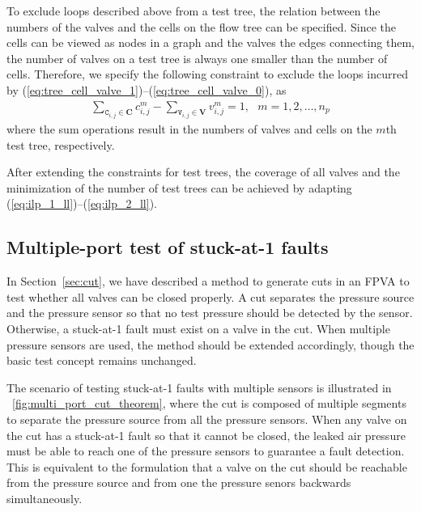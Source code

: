 \documentclass[journal,twoside]{IEEEtran}
\begin{document}
To exclude loops described above from a test tree, the relation between the numbers of the valves and
the
cells on the flow tree can be specified. Since the cells can be viewed as nodes
in a graph and the valves the edges connecting them, the number of valves on a
test tree is always one smaller than the number of cells. Therefore, we specify
the following constraint to exclude the loops incurred by 
 (\ref{eq:tree_cell_valve_1})--(\ref{eq:tree_cell_valve_0}), as
\begin{align}\label{eq:tree_cell_valve_jointloop}
  \sum_{\mathtt{C}_{i,j} \in \mathbf{C}} c^m_{i,j} -
  \sum_{\mathtt{V}_{i,j}\in \mathbf{V}} v^m_{i,j} 
  =1,\ \ \ m=1, 2,\dots, n_p
\end{align}
where the sum operations result in the numbers of valves and cells on the $m$th
test tree, respectively.

After extending the constraints for test trees, the coverage of all valves 
and the minimization of the number of test trees can be achieved by adapting
(\ref{eq:ilp_1_ll})--(\ref{eq:ilp_2_ll}).

\subsection{Multiple-port test of stuck-at-1 faults}
\label{sec:multiple_port_cut}

In Section~\ref{sec:cut}, we have described a method to generate cuts in an
FPVA to test whether all valves can be closed properly. A cut separates the
pressure source and the pressure sensor so that no test pressure should be
detected by the sensor. Otherwise, a stuck-at-1 fault must exist on a
valve in the cut. When multiple pressure sensors are used, the method should be
extended accordingly, though the basic test concept remains unchanged.

The scenario of testing stuck-at-1 faults with multiple sensors is illustrated in
\figname~\ref{fig:multi_port_cut_theorem}, where the cut is composed of
multiple segments to separate the pressure source from all the pressure
sensors.
When any valve on the cut has a stuck-at-1
fault so that it cannot be closed, the leaked air pressure must be able to reach
one of the pressure sensors to guarantee a fault detection. 
This is equivalent to the formulation that a valve
on the cut should be reachable from the pressure source and from one the
pressure senors backwards simultaneously.
\end{document}
